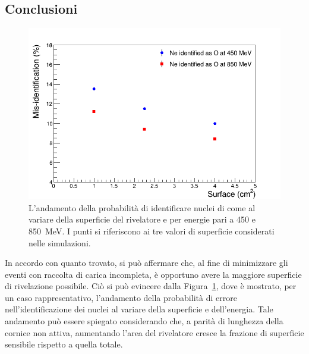 \subsection*{Conclusioni}





\begin{figure} [!t]
	\centering
	\includegraphics[width=\textwidth, keepaspectratio]{Grafici_Tesi/Granularita/misident_surface3.png}
	\caption{L'andamento della probabilità di identificare nuclei di  come  al variare della superficie del rivelatore e per energie pari a 450 e 850~MeV. I punti si riferiscono ai tre valori di superficie considerati nelle simulazioni.} \label{fig:misident_vs_surface}
\end{figure}




In accordo con quanto trovato, si può affermare che, al fine di minimizzare gli eventi con raccolta di carica incompleta, è opportuno avere la maggiore superficie di rivelazione possibile.
Ciò si può evincere dalla Figura~\ref{fig:misident_vs_surface}, dove è mostrato, per un caso rappresentativo, l'andamento della probabilità di errore nell'identificazione dei nuclei al variare della superficie e dell'energia.
Tale andamento può essere spiegato considerando che, a parità di lunghezza della cornice non attiva, aumentando l'area del rivelatore cresce la frazione di superficie sensibile rispetto a quella totale.




